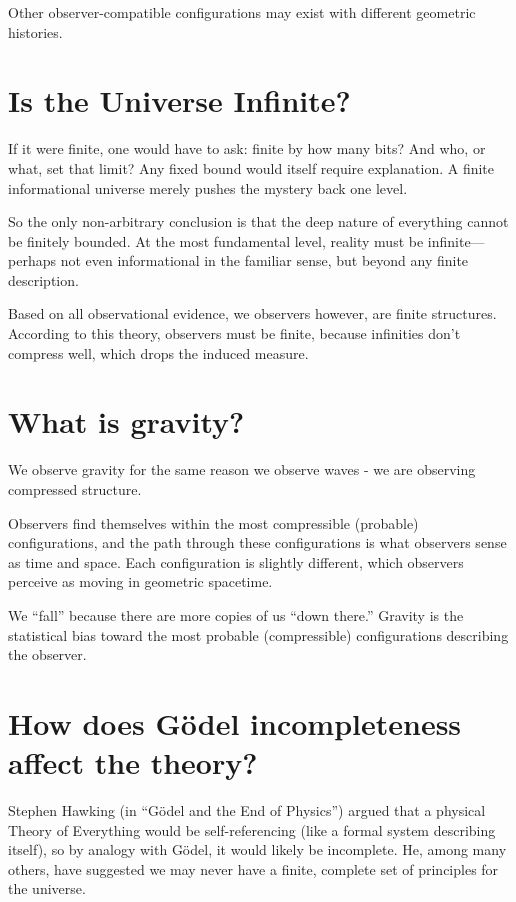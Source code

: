 Other observer-compatible configurations may exist with different geometric histories.


\section*{Is the Universe Infinite?}

If it were finite, one would have to ask: finite by how many bits? And who, or what, set that limit? Any fixed bound would itself require explanation.
A finite informational universe merely pushes the mystery back one level. 

So the only non-arbitrary conclusion is that the deep nature of everything cannot be finitely bounded.
At the most fundamental level, reality must be infinite—perhaps not even informational in the familiar sense, but beyond any finite description.

Based on all observational evidence, we observers however, are finite structures. According to this theory, observers
must be finite, because infinities don't compress well, which drops the induced measure.


\section*{What is gravity?}

We observe gravity for the same reason we observe waves - we are observing compressed structure.

Observers find themselves within the most compressible (probable) configurations, and the path through these configurations is what observers sense as time and space.
Each configuration is slightly different, which observers perceive as moving in geometric spacetime.

We ``fall'' because there are more copies of us ``down there.'' Gravity is the statistical bias toward the most probable (compressible) configurations describing the observer.


\section*{How does Gödel incompleteness affect the theory?}

Stephen Hawking (in “Gödel and the End of Physics”) argued that a physical Theory of Everything would be self-referencing (like a formal system describing itself), so by analogy with Gödel, it would likely be incomplete.
He, among many others, have suggested we may never have a finite, complete set of principles for the universe.

